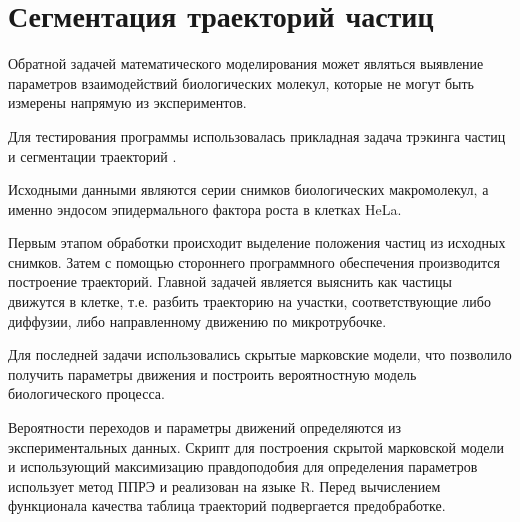 \section*{Сегментация траекторий частиц}

Обратной задачей математического моделирования
может являться выявление параметров взаимодействий биологических молекул,
которые не могут быть измерены напрямую из экспериментов.

Для тестирования программы использовалась
прикладная задача трэкинга частиц
и сегментации траекторий \cite{pisarev2015tracker}.

Исходными данными являются
серии снимков биологических макромолекул,
а именно эндосом эпидермального фактора роста
в клетках HeLa.

Первым этапом обработки происходит выделение
положения частиц из исходных снимков.
Затем с помощью стороннего программного обеспечения
производится построение траекторий.
Главной задачей является выяснить
как частицы движутся в клетке,
т.е. разбить траекторию на участки,
соответствующие либо диффузии,
либо направленному движению по микротрубочке.

Для последней задачи использовались
скрытые марковские модели,
что позволило получить
параметры движения и
построить вероятностную модель
биологического процесса.

Вероятности переходов и параметры движений
определяются из экспериментальных данных.
Скрипт для построения скрытой марковской модели
и использующий максимизацию правдоподобия
для определения параметров использует
метод ППРЭ и реализован на языке R.
Перед вычислением функционала качества
таблица траекторий подвергается предобработке.

